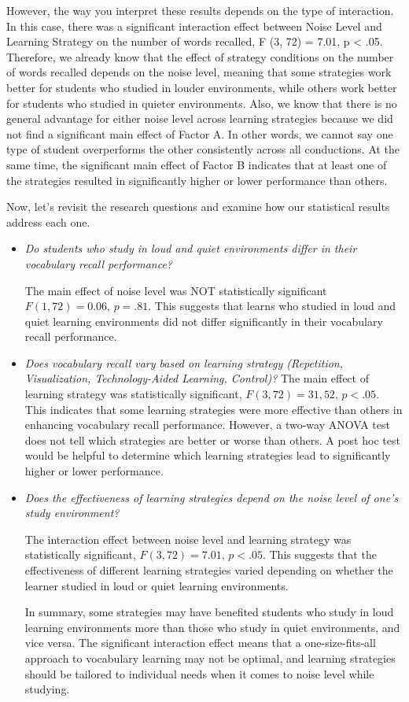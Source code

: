 \documentclass[
  letterpaper,
  DIV=11,
  numbers=noendperiod]{scrreprt}
\begin{document}
However, the way you interpret these results depends on the type of
interaction. In this case, there was a significant interaction effect
between Noise Level and Learning Strategy on the number of words
recalled, F (3, 72) = 7.01, p \textless{} .05. Therefore, we already
know that the effect of strategy conditions on the number of words
recalled depends on the noise level, meaning that some strategies work
better for students who studied in louder environments, while others
work better for students who studied in quieter environments. Also, we
know that there is no general advantage for either noise level across
learning strategies because we did not find a significant main effect of
Factor A. In other words, we cannot say one type of student overperforms
the other consistently across all conductions. At the same time, the
significant main effect of Factor B indicates that at least one of the
strategies resulted in significantly higher or lower performance than
others.

Now, let's revisit the research questions and examine how our
statistical results address each one.

\begin{itemize}
\item
  \emph{Do students who study in loud and quiet environments differ in
  their vocabulary recall performance?}

  The main effect of noise level was NOT statistically significant
  \(F(1, 72) = 0.06, \, p = .81\). This suggests that learns who studied
  in loud and quiet learning environments did not differ significantly
  in their vocabulary recall performance.
\item
  \emph{Does vocabulary recall vary based on learning strategy
  (Repetition, Visualization, Technology-Aided Learning, Control)?} The
  main effect of learning strategy was statistically significant,
  \(F(3, 72) = 31,52, \, p < .05\). This indicates that some learning
  strategies were more effective than others in enhancing vocabulary
  recall performance. However, a two-way ANOVA test does not tell which
  strategies are better or worse than others. A post hoc test would be
  helpful to determine which learning strategies lead to significantly
  higher or lower performance.
\item
  \emph{Does the effectiveness of learning strategies depend on the
  noise level of one's study environment?}

  The interaction effect between noise level and learning strategy was
  statistically significant, \(F(3, 72) = 7.01, \, p < .05\). This
  suggests that the effectiveness of different learning strategies
  varied depending on whether the learner studied in loud or quiet
  learning environments.

  In summary, some strategies may have benefited students who study in
  loud learning environments more than those who study in quiet
  environments, and vice versa. The significant interaction effect means
  that a one-size-fits-all approach to vocabulary learning may not be
  optimal, and learning strategies should be tailored to individual
  needs when it comes to noise level while studying.
\end{itemize}
\end{document}
